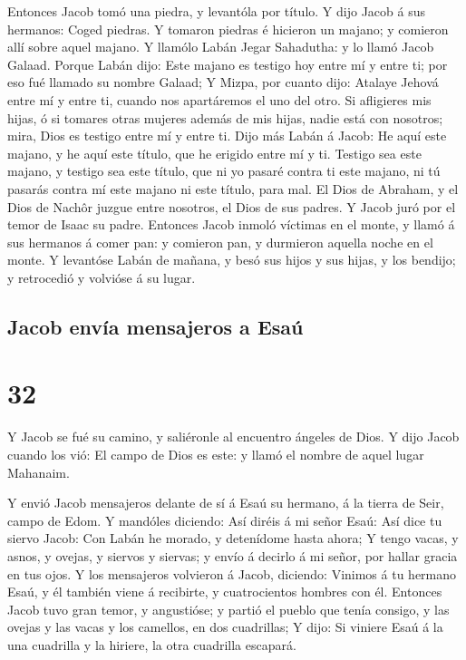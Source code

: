  Entonces Jacob tomó una piedra, y levantóla por título.
 Y dijo Jacob á sus hermanos: Coged piedras. Y tomaron
piedras é hicieron un majano; y comieron allí sobre aquel majano.
 Y llamólo Labán Jegar Sahadutha: y lo llamó Jacob
Galaad.  Porque Labán dijo: Este majano es testigo hoy
entre mí y entre ti; por eso fué llamado su nombre Galaad;
 Y Mizpa, por cuanto dijo: Atalaye Jehová entre mí y
entre ti, cuando nos apartáremos el uno del otro.  Si
afligieres mis hijas, ó si tomares otras mujeres además de mis hijas,
nadie está con nosotros; mira, Dios es testigo entre mí y entre ti.
 Dijo más Labán á Jacob: He aquí este majano, y he aquí
este título, que he erigido entre mí y ti.  Testigo sea
este majano, y testigo sea este título, que ni yo pasaré contra ti este
majano, ni tú pasarás contra mí este majano ni este título, para mal.
 El Dios de Abraham, y el Dios de Nachôr juzgue entre
nosotros, el Dios de sus padres. Y Jacob juró por el temor de Isaac su
padre.  Entonces Jacob inmoló víctimas en el monte, y
llamó á sus hermanos á comer pan: y comieron pan, y durmieron aquella
noche en el monte.  Y levantóse Labán de mañana, y besó
sus hijos y sus hijas, y los bendijo; y retrocedió y volvióse á su
lugar.

\hypertarget{jacob-envuxeda-mensajeros-a-esauxfa}{%
\subsection{Jacob envía mensajeros a
Esaú}\label{jacob-envuxeda-mensajeros-a-esauxfa}}

\hypertarget{section-31}{%
\section{32}\label{section-31}}

 Y Jacob se fué su camino, y saliéronle al encuentro
ángeles de Dios.  Y dijo Jacob cuando los vió: El campo de
Dios es este: y llamó el nombre de aquel lugar Mahanaim.

 Y envió Jacob mensajeros delante de sí á Esaú su hermano,
á la tierra de Seir, campo de Edom.  Y mandóles diciendo:
Así diréis á mi señor Esaú: Así dice tu siervo Jacob: Con Labán he
morado, y detenídome hasta ahora;  Y tengo vacas, y asnos,
y ovejas, y siervos y siervas; y envío á decirlo á mi señor, por hallar
gracia en tus ojos.  Y los mensajeros volvieron á Jacob,
diciendo: Vinimos á tu hermano Esaú, y él también viene á recibirte, y
cuatrocientos hombres con él.  Entonces Jacob tuvo gran
temor, y angustióse; y partió el pueblo que tenía consigo, y las ovejas
y las vacas y los camellos, en dos cuadrillas;  Y dijo: Si
viniere Esaú á la una cuadrilla y la hiriere, la otra cuadrilla
escapará.

